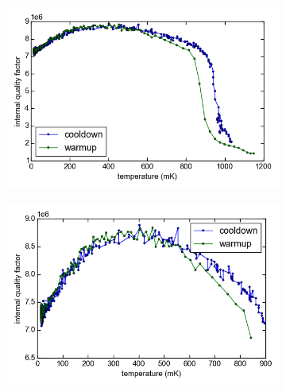 \documentclass[12pt]{report}
\begin{document}
\begin{figure}[h]
    \centering
    \begin{subfigure}[b]{.49\textwidth}
        \label{fig:temperature_tracking_Qi_drop}
        \includegraphics[width=\textwidth]{Figures/Temperature tracking drop - Qi vs T.png}
    \end{subfigure}
    \begin{subfigure}[b]{.49\textwidth}
        \label{fig:temperature_tracking_Qi_nodrop}
        \includegraphics[width=\textwidth]{Figures/Temperature tracking - no drop - Qi vs T.png}
    \end{subfigure}
    \label{fig:temperature_tracking_Qi}
\end{figure}
\end{document}
